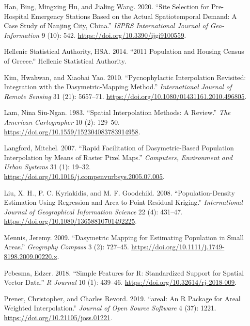 \begin{CSLReferences}{1}{0}
\leavevmode{}%
Han, Bing, Mingxing Hu, and Jialing Wang. 2020. {``Site Selection for Pre-Hospital Emergency Stations Based on the Actual Spatiotemporal Demand: A Case Study of Nanjing City, China.''} \emph{ISPRS International Journal of Geo-Information} 9 (10): 542. \url{https://doi.org/10.3390/ijgi9100559}.

\leavevmode{}%
Hellenic Statistical Authority, HSA. 2014. {``2011 Population and Housing Census of Greece.''} Hellenic Statistical Authority.

\leavevmode{}%
Kim, Hwahwan, and Xiaobai Yao. 2010. {``Pycnophylactic Interpolation Revisited: Integration with the Dasymetric-Mapping Method.''} \emph{International Journal of Remote Sensing} 31 (21): 5657--71. \url{https://doi.org/10.1080/01431161.2010.496805}.

\leavevmode{}%
Lam, Nina Siu-Ngan. 1983. {``Spatial Interpolation Methods: A Review.''} \emph{The American Cartographer} 10 (2): 129--50. \url{https://doi.org/10.1559/152304083783914958}.

\leavevmode{}%
Langford, Mitchel. 2007. {``Rapid Facilitation of Dasymetric-Based Population Interpolation by Means of Raster Pixel Maps.''} \emph{Computers, Environment and Urban Systems} 31 (1): 19--32. \url{https://doi.org/10.1016/j.compenvurbsys.2005.07.005}.

\leavevmode{}%
Liu, X. H., P. C. Kyriakidis, and M. F. Goodchild. 2008. {``Population-Density Estimation Using Regression and Area-to-Point Residual Kriging.''} \emph{International Journal of Geographical Information Science} 22 (4): 431--47. \url{https://doi.org/10.1080/13658810701492225}.

\leavevmode{}%
Mennis, Jeremy. 2009. {``Dasymetric Mapping for Estimating Population in Small Areas.''} \emph{Geography Compass} 3 (2): 727--45. \url{https://doi.org/10.1111/j.1749-8198.2009.00220.x}.

\leavevmode{}%
Pebesma, Edzer. 2018. {``Simple Features for {R}: Standardized Support for Spatial Vector Data.''} \emph{R Journal} 10 (1): 439--46. \url{https://doi.org/10.32614/rj-2018-009}.

\leavevmode{}%
Prener, Christopher, and Charles Revord. 2019. {``{areal}: An {R} Package for Areal Weighted Interpolation.''} \emph{Journal of Open Source Software} 4 (37): 1221. \url{https://doi.org/10.21105/joss.01221}.


\end{CSLReferences}
